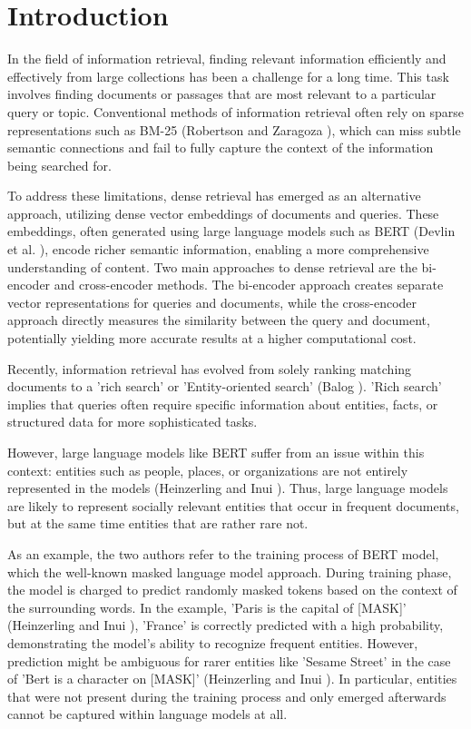 \section{Introduction}\label{sec:introduction}

In the field of information retrieval, finding relevant information efficiently and effectively from large collections has been a challenge for a long time. This task involves finding documents or passages that are most relevant to a particular query or topic. Conventional methods of information retrieval often rely on sparse representations such as BM-25 (Robertson and Zaragoza \cite{BM25}), which can miss subtle semantic connections and fail to fully capture the context of the information being searched for.

To address these limitations, dense retrieval has emerged as an alternative approach, utilizing dense vector embeddings of documents and queries. These embeddings, often generated using large language models such as BERT (Devlin et al. \cite{bert}), encode richer semantic information, enabling a more comprehensive understanding of content. Two main approaches to dense retrieval are the bi-encoder and cross-encoder methods. The bi-encoder approach creates separate vector representations for queries and documents, while the cross-encoder approach directly measures the similarity between the query and document, potentially yielding more accurate results at a higher computational cost.

Recently, information retrieval has evolved from solely ranking matching documents to a 'rich search' or 'Entity-oriented search' (Balog \cite{balog2018entity}). 'Rich search' implies that queries often require specific information about entities, facts, or structured data for more sophisticated tasks.

However, large language models like BERT suffer from an issue within this context: entities such as people, places, or organizations are not entirely represented in the models (Heinzerling and Inui \cite{limitations}). Thus, large language models are likely to represent socially relevant entities that occur in frequent documents, but at the same time entities that are rather rare not.

As an example, the two authors refer to the training process of BERT model, which the well-known masked language model approach. During training phase, the model is charged to predict randomly masked tokens based on the context of the surrounding words. In the example, 'Paris is the capital of [MASK]' (Heinzerling and Inui \cite{limitations}), 'France' is correctly predicted with a high probability, demonstrating the model's ability to recognize frequent entities. However, prediction might be ambiguous for rarer entities like 'Sesame Street' in the case of 'Bert is a character on [MASK]' (Heinzerling and Inui \cite{limitations}). In particular, entities that were not present during the training process and only emerged afterwards cannot be captured within language models at all.

